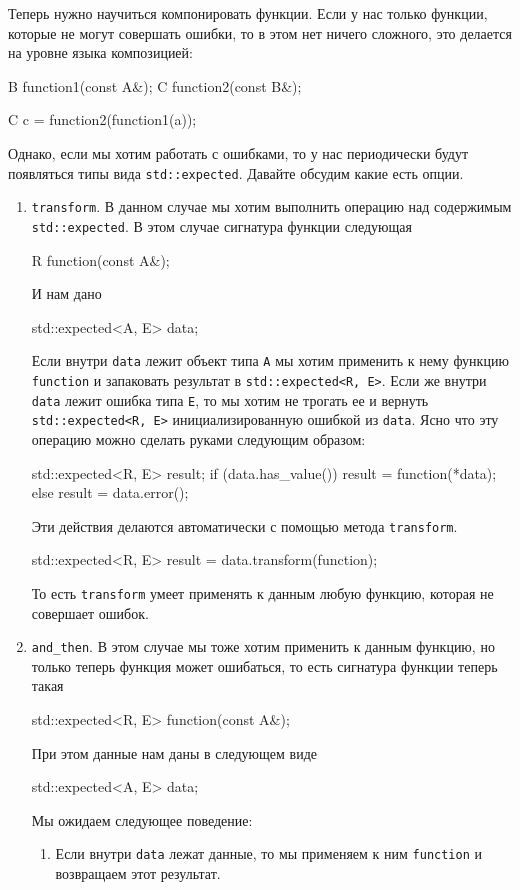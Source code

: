 Теперь нужно научиться компонировать функции.
Если у нас только функции, которые не могут совершать ошибки, то в этом нет ничего сложного, это делается на уровне языка композицией:
\begin{cppcode}
B function1(const A&);
C function2(const B&);

C c = function2(function1(a));
\end{cppcode}
Однако, если мы хотим работать с ошибками, то у нас периодически будут появляться типы вида \verb"std::expected".
Давайте обсудим какие есть опции.
\begin{enumerate}
\item \verb"transform".
В данном случае мы хотим выполнить операцию над содержимым \verb"std::expected".
В этом случае сигнатура функции следующая
\begin{cppcode}
R function(const A&);
\end{cppcode}
И нам дано
\begin{cppcode}
std::expected<A, E> data;
\end{cppcode}
Если внутри \verb"data" лежит объект типа \verb"A" мы хотим применить к нему функцию \verb"function" и запаковать результат в \verb"std::expected<R, E>".
Если же внутри \verb"data" лежит ошибка типа \verb"E", то мы хотим не трогать ее и вернуть \verb"std::expected<R, E>" инициализированную ошибкой из \verb"data".
Ясно что эту операцию можно сделать руками следующим образом:
\begin{cppcode}
std::expected<R, E> result;
if (data.has_value()) {
  result = function(*data);
} else {
  result = data.error();
}
\end{cppcode}
Эти действия делаются автоматически с помощью метода \verb"transform".
\begin{cppcode}
std::expected<R, E> result = data.transform(function);
\end{cppcode}
То есть \verb"transform" умеет применять к данным любую функцию, которая не совершает ошибок.

\item \verb"and_then".
В этом случае мы тоже хотим применить к данным функцию, но только теперь функция может ошибаться, то есть сигнатура функции теперь такая
\begin{cppcode}
std::expected<R, E> function(const A&);
\end{cppcode}
При этом данные нам даны в следующем виде
\begin{cppcode}
std::expected<A, E> data;
\end{cppcode}
Мы ожидаем следующее поведение:
\begin{enumerate}
\item Если внутри \verb"data" лежат данные, то мы применяем к ним \verb"function" и возвращаем этот результат.


\end{enumerate}
\end{enumerate}
